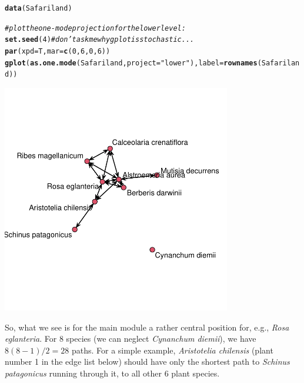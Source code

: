 \documentclass[a4paper, 11pt]{article}\usepackage[]{graphicx}\usepackage[]{color}
\makeatletter
\newcommand{\hlnum}[1]{\textcolor[rgb]{0.686,0.059,0.569}{#1}}%
\newcommand{\hlstr}[1]{\textcolor[rgb]{0.192,0.494,0.8}{#1}}%
\newcommand{\hlcom}[1]{\textcolor[rgb]{0.678,0.584,0.686}{\textit{#1}}}%
\newcommand{\hlstd}[1]{\textcolor[rgb]{0.345,0.345,0.345}{#1}}%
\newcommand{\hlkwc}[1]{\textcolor[rgb]{0.333,0.667,0.333}{#1}}%
\newcommand{\hlkwd}[1]{\textcolor[rgb]{0.737,0.353,0.396}{\textbf{#1}}}%
\newenvironment{kframe}{%
 \def\at@end@of@kframe{}%
 \ifinner\ifhmode%
  \def\at@end@of@kframe{\end{minipage}}%
  \begin{minipage}{\columnwidth}%
 \fi\fi%
 \def\FrameCommand##1{\hskip\@totalleftmargin \hskip-\fboxsep
 \colorbox{shadecolor}{##1}\hskip-\fboxsep
     \hskip-\linewidth \hskip-\@totalleftmargin \hskip\columnwidth}%
 \MakeFramed {\advance\hsize-\width
   \@totalleftmargin\z@ \linewidth\hsize
   \@setminipage}}%
 {\par\unskip\endMakeFramed%
 \at@end@of@kframe}
\newenvironment{knitrout}{}{} %
\makeatother
\begin{document}
\begin{knitrout}
\color{fgcolor}\begin{kframe}
\begin{alltt}
\hlkwd{data}\hlstd{(Safariland)}

\hlcom{# plot the one-mode projection for the lower level:}
\hlkwd{set.seed}\hlstd{(}\hlnum{4}\hlstd{)} \hlcom{# don't ask me why gplot is stochastic ...}
\hlkwd{par}\hlstd{(}\hlkwc{xpd}\hlstd{=T,} \hlkwc{mar}\hlstd{=}\hlkwd{c}\hlstd{(}\hlnum{0}\hlstd{,}\hlnum{6}\hlstd{,}\hlnum{0}\hlstd{,}\hlnum{6}\hlstd{))}
\hlkwd{gplot}\hlstd{(}\hlkwd{as.one.mode}\hlstd{(Safariland,} \hlkwc{project}\hlstd{=}\hlstr{"lower"}\hlstd{),} \hlkwc{label}\hlstd{=}\hlkwd{rownames}\hlstd{(Safariland))}
\end{alltt}
\end{kframe}
\end{knitrout}
{
\centering
	\includegraphics[width=0.75\textwidth]{figures/betweenPlot}
}

So, what we see is for the main module a rather central position for, e.g., \emph{Rosa eglanteria}. For 8 species (we can neglect \emph{Cynanchum diemii}), we have $8(8-1)/2=28$ paths. For a simple example, \emph{Aristotelia chilensis} (plant number 1 in the edge list below) should have only the shortest path to \emph{Schinus patagonicus} running through it, to all other 6 plant species. 
\end{document}
